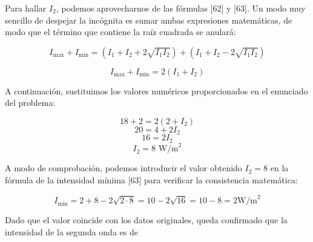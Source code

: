 \documentclass[11pt, a4paper]{article}
\newenvironment{problem}[1][Cuestión]{
	\vspace{0.5cm}
	\noindent{\Large\bfseries #1} \par\vspace{0.5cm}
}{
	\vspace{0.5cm}
}
\begin{document}
\begin{problem}[Cuestión 4]
{		Para hallar $I_2$, podemos aprovecharnos de las fórmulas [62] y [63]. Un modo muy sencillo de despejar la incógnita es sumar ambas expresiones matemáticas, de modo que el término que contiene la raíz cuadrada se anulará:

		$$
		I_{\text{max}} + I_{\text{min}} = \left(I_1 + I_2 + 2 \sqrt{I_1 I_2} \right) + \left( I_1 + I_2 - 2 \sqrt{I_1 I_2} \right)
		$$

		$$
		I_{\text{max}} + I_{\text{min}} = 2(I_1 + I_2)
		$$

		A continuación, sustituimos los valores numéricos proporcionados en el enunciado del problema:

		$$
		18 + 2 = 2(2 + I_2)
		$$
		$$
		20 = 4 + 2 I_2
		$$
		$$
		16 = 2 I_2
		$$
		$$
		I_2 = 8 \text{ W/m}^2
		$$

		A modo de comprobación, podemos introducir el valor obtenido $I_2  =8$ en la fórmula de la intensidad mínima [63] para verificar la consistencia matemática: 

		$$
		I_{\text{min}} = 2 + 8 - 2 \sqrt{2 \cdot 8} = 10 - 2 \sqrt{16} = 10 - 8 = 2 \text{W/m}^2
		$$

		Dado que el valor coincide con los datos originales, queda confirmado que la intensidad de la segunda onda es de
	}
	\end{problem}
\end{document}

